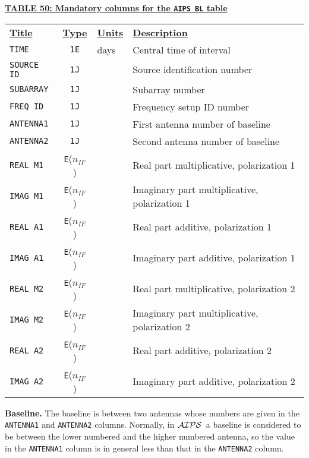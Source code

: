 \documentclass[twoside]{article}
\newcommand{\AIPS}{{$\cal AIPS\/$}}
\newcommand{\nif}{$n_{IF}$}
\begin{document}
\begin{center}
\underline{\bf{TABLE 50: Mandatory columns for the {\tt AIPS BL} table}}\\
\begin{tabular}{lcll}
\noalign{\vspace{2pt}} \label{ta:BLcols}
\underline{{\bf Title\vphantom{y}}} & \underline{\bf{Type}} &
   \underline{{\bf Units\vphantom{y}}} & \underline{\bf{Description}} \\
\noalign{\vspace{2pt}}
{\tt TIME}      & {\tt 1E} & days & Central time of interval \\
{\tt SOURCE ID} & {\tt 1J} &      & Source identification number \\
{\tt SUBARRAY}  & {\tt 1J} &      & Subarray number \\
{\tt FREQ ID}   & {\tt 1J} &      & Frequency setup ID number \\
{\tt ANTENNA1}  & {\tt 1J} &      & First antenna number of baseline \\
{\tt ANTENNA2}  & {\tt 1J} &      & Second antenna number of baseline \\
{\tt REAL M1}   & {\tt E}(\nif) & & Real part multiplicative, polarization 1 \\
{\tt IMAG M1}   & {\tt E}(\nif) & & Imaginary part multiplicative, polarization 1 \\
{\tt REAL A1}   & {\tt E}(\nif) & & Real part additive, polarization 1 \\
{\tt IMAG A1}   & {\tt E}(\nif) & & Imaginary part additive, polarization 1 \\
\hline
{\tt REAL M2}   & {\tt E}(\nif) & & Real part multiplicative, polarization 2 \\
{\tt IMAG M2}   & {\tt E}(\nif) & & Imaginary part multiplicative, polarization 2 \\
{\tt REAL A2}   & {\tt E}(\nif) & & Real part additive, polarization 2 \\
{\tt IMAG A2}   & {\tt E}(\nif) & & Imaginary part additive, polarization 2
\end{tabular}
\end{center}

{\bf Baseline.} The baseline is between two antennas whose numbers are
given in the {\tt ANTENNA1} and {\tt ANTENNA2} columns.  Normally, in
\AIPS\ a baseline is considered to be between the lower numbered and
the higher numbered antenna, so the value in the {\tt ANTENNA1} column
is in general less than that in the {\tt ANTENNA2} column.
\end{document}
